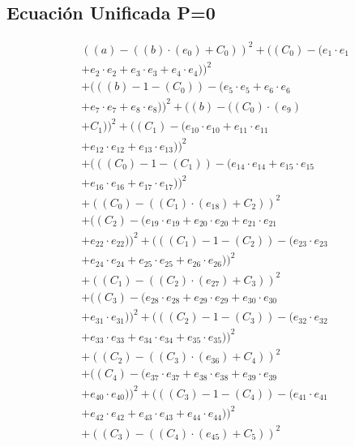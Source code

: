 \documentclass[10pt, a4paper]{article}
\begin{document}
\subsection*{Ecuación Unificada P=0}
\begin{align*}
& ((a) - ((b)  \cdot  (e_{0}) + C_{0}))^{2} + ((C_{0}) - (e_{1} \cdot e_{1} \\
& + e_{2} \cdot e_{2} + e_{3} \cdot e_{3} + e_{4} \cdot e_{4}))^{2} \\
& + (((b) - 1 - (C_{0})) - (e_{5} \cdot e_{5} + e_{6} \cdot e_{6} \\
& + e_{7} \cdot e_{7} + e_{8} \cdot e_{8}))^{2} + ((b) - ((C_{0})  \cdot  (e_{9}) \\
& + C_{1}))^{2} + ((C_{1}) - (e_{10} \cdot e_{10} + e_{11} \cdot e_{11} \\
& + e_{12} \cdot e_{12} + e_{13} \cdot e_{13}))^{2} \\
& + (((C_{0}) - 1 - (C_{1})) - (e_{14} \cdot e_{14} + e_{15} \cdot e_{15} \\
& + e_{16} \cdot e_{16} + e_{17} \cdot e_{17}))^{2} \\
& + ((C_{0}) - ((C_{1})  \cdot  (e_{18}) + C_{2}))^{2} \\
& + ((C_{2}) - (e_{19} \cdot e_{19} + e_{20} \cdot e_{20} + e_{21} \cdot e_{21} \\
& + e_{22} \cdot e_{22}))^{2} + (((C_{1}) - 1 - (C_{2})) - (e_{23} \cdot e_{23} \\
& + e_{24} \cdot e_{24} + e_{25} \cdot e_{25} + e_{26} \cdot e_{26}))^{2} \\
& + ((C_{1}) - ((C_{2})  \cdot  (e_{27}) + C_{3}))^{2} \\
& + ((C_{3}) - (e_{28} \cdot e_{28} + e_{29} \cdot e_{29} + e_{30} \cdot e_{30} \\
& + e_{31} \cdot e_{31}))^{2} + (((C_{2}) - 1 - (C_{3})) - (e_{32} \cdot e_{32} \\
& + e_{33} \cdot e_{33} + e_{34} \cdot e_{34} + e_{35} \cdot e_{35}))^{2} \\
& + ((C_{2}) - ((C_{3})  \cdot  (e_{36}) + C_{4}))^{2} \\
& + ((C_{4}) - (e_{37} \cdot e_{37} + e_{38} \cdot e_{38} + e_{39} \cdot e_{39} \\
& + e_{40} \cdot e_{40}))^{2} + (((C_{3}) - 1 - (C_{4})) - (e_{41} \cdot e_{41} \\
& + e_{42} \cdot e_{42} + e_{43} \cdot e_{43} + e_{44} \cdot e_{44}))^{2} \\
& + ((C_{3}) - ((C_{4})  \cdot  (e_{45}) + C_{5}))^{2} \\

\end{align*}
\end{document}
